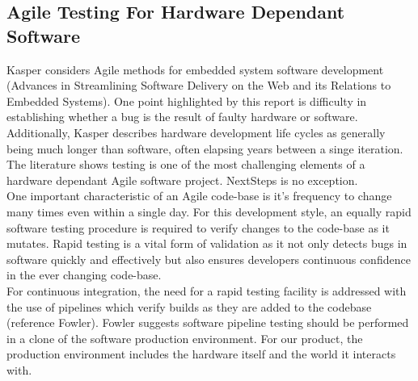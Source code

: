 \documentclass{l3proj}
\begin{document}
\subsection{Agile Testing For Hardware Dependant Software}
Kasper considers Agile methods for embedded system software development (Advances in Streamlining Software Delivery on the Web and
its Relations to Embedded Systems). One point highlighted by this report is difficulty in establishing whether a bug is the result of faulty hardware or software. Additionally, Kasper describes hardware development life cycles as generally being much longer than software, often elapsing years between a singe iteration. The literature shows testing is one of the most challenging elements of a hardware dependant Agile software project. NextSteps is no exception. 
\\One important characteristic of an Agile code-base is it's frequency to change many times even within a single day.
 For this development style, an equally rapid software testing procedure is required to verify changes to the code-base as it mutates. 
 Rapid testing is a vital form of validation as it not only detects bugs in software quickly and effectively but also ensures developers continuous confidence in the ever changing code-base.
\\ For continuous integration, the need for a rapid testing facility is addressed with the use of pipelines which verify builds as they are added to the codebase (reference Fowler). 
Fowler suggests software pipeline testing should be performed in a clone of the software production environment. For our product, the production environment includes the hardware itself and the world it interacts with.
\end{document}
